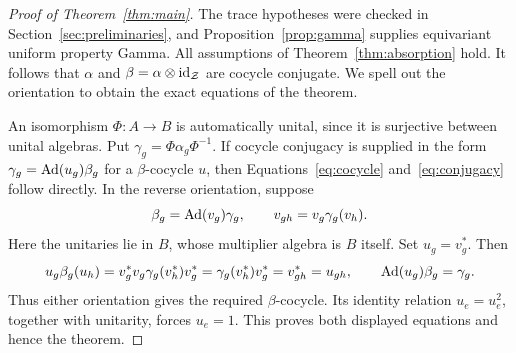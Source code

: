 \begin{proof}[Proof of Theorem~\ref{thm:main}]
The trace hypotheses were checked in Section~\ref{sec:preliminaries},
and Proposition~\ref{prop:gamma} supplies equivariant uniform property
Gamma. All assumptions of Theorem~\ref{thm:absorption} hold.
It follows that \(\alpha\) and
\(\beta=\alpha\otimes\operatorname{id}_{\mathcal Z}\) are cocycle conjugate.
We spell out the orientation to obtain the exact equations of the
theorem.

An isomorphism \(\Phi:A\to B\) is automatically unital, since it is
surjective between unital algebras. Put
\(\gamma_g=\Phi\alpha_g\Phi^{-1}\).
If cocycle conjugacy is supplied in the form
\(\gamma_g=\operatorname{Ad}(u_g)\beta_g\) for a \(\beta\)-cocycle \(u\), then
Equations~\eqref{eq:cocycle} and~\eqref{eq:conjugacy} follow directly.
In the reverse orientation, suppose
\[
 \beta_g=\operatorname{Ad}(v_g)\gamma_g,\qquad
 v_{gh}=v_g\gamma_g(v_h).
\]
Here the unitaries lie in \(B\), whose multiplier algebra is \(B\)
itself. Set \(u_g=v_g^*\). Then
\[
 u_g\beta_g(u_h)
   =v_g^*v_g\gamma_g(v_h^*)v_g^*
   =\gamma_g(v_h^*)v_g^*
   =v_{gh}^*
   =u_{gh},
 \qquad
 \operatorname{Ad}(u_g)\beta_g=\gamma_g.
\]
Thus either orientation gives the required \(\beta\)-cocycle.
Its identity relation \(u_e=u_e^2\), together with unitarity,
forces \(u_e=1\). This proves both displayed equations and hence
the theorem.
\end{proof}
